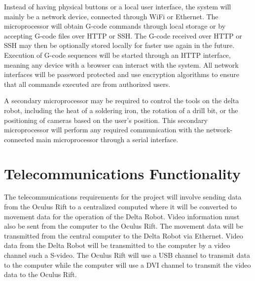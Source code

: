 \documentclass[11pt]{report}
\begin{document}
Instead of having physical buttons or a local user interface, the system will mainly be a network device, connected through WiFi or Ethernet.
The microprocessor will obtain G-code commands through local storage or by accepting G-code files over HTTP or SSH.
The G-code received over HTTP or SSH may then be optionally stored locally for faster use again in the future.
Execution of G-code sequences will be started through an HTTP interface, meaning any device with a browser can interact with the system.
All network interfaces will be password protected and use encryption algorithms to ensure that all commands executed are from authorized users. 

A secondary microprocessor may be required to control the tools on the delta robot, including the heat of a soldering iron, the rotation of a drill bit, or the positioning of cameras based on the user's position.
This secondary microprocessor will perform any required communication with the network-connected main microprocessor through a serial interface. 

\section{Telecommunications Functionality}
The telecommunications requirements for the project will involve sending data from the Oculus Rift to a centralized computed where it will be converted to movement data for the operation of the Delta Robot.
Video information must also be sent from the computer to the Oculus Rift.
The movement data will be transmitted from the central computer to the Delta Robot via Ethernet.
Video data from the Delta Robot will be transmitted to the computer by a video channel such a S-video.
The Oculus Rift will use a USB channel to transmit data to the computer while the computer will use a DVI channel to transmit the video data to the Oculus Rift.
\end{document}
